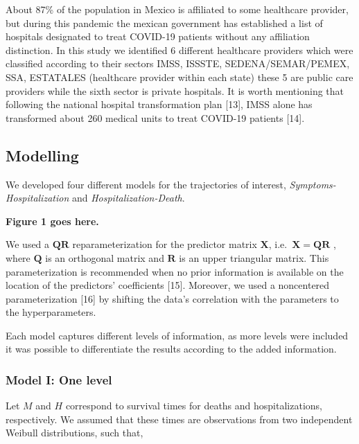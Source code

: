 \documentclass[10pt,letterpaper]{article}
\begin{document}
About 87\% of the population in Mexico is affiliated to some healthcare
provider, but during this pandemic the mexican government has
established a list of hospitals designated to treat COVID-19 patients
without any affiliation distinction. In this study we identified 6
different healthcare providers which were classified according to their
sectors IMSS, ISSSTE, SEDENA/SEMAR/PEMEX, SSA, ESTATALES (healthcare
provider within each state) these 5 are public care providers while the
sixth sector is private hospitals. It is worth mentioning that following
the national hospital transformation plan {[}13{]}, IMSS alone has
transformed about 260 medical units to treat COVID-19 patients {[}14{]}.

\hypertarget{modelling}{%
\subsection{Modelling}\label{modelling}}

We developed four different models for the trajectories of interest,
\emph{Symptoms-Hospitalization} and \emph{Hospitalization-Death}.
\vspace{5mm}

\begin{center}
\textbf{Figure 1 goes here.}
\end{center}

\vspace{5mm}

We used a \(\mathbf{QR}\) reparameterization for the predictor matrix
\(\mathbf{X}\), i.e.~\(\mathbf{X}=\mathbf{QR}\) , where \(\mathbf{Q}\)
is an orthogonal matrix and \(\mathbf{R}\) is an upper triangular
matrix. This parameterization is recommended when no prior information
is available on the location of the predictors' coefficients {[}15{]}.
Moreover, we used a noncentered parameterization {[}16{]} by shifting
the data's correlation with the parameters to the hyperparameters.

Each model captures different levels of information, as more levels were
included it was possible to differentiate the results according to the
added information.

\hypertarget{model-i-one-level}{%
\subsubsection{Model I: One level}\label{model-i-one-level}}

Let \(M\) and \(H\) correspond to survival times for deaths and
hospitalizations, respectively. We assumed that these times are
observations from two independent Weibull distributions, such that,
\end{document}
